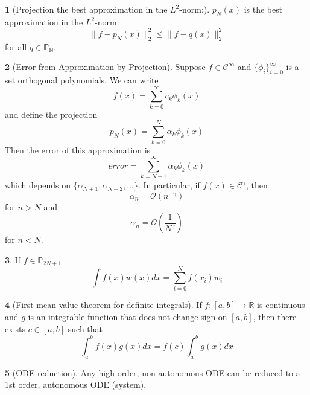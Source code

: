 \documentclass[12pt]{article}
\theoremstyle{definition}
\newtheorem{theorem}{\color{ForestGreen}{\textbf{Theorem}}}
\newcommand{\R}{\mathbb{R}}
\newcommand{\norm}[1]{\lVert#1\rVert}
\begin{document}
\begin{theorem}[Projection the best approximation in the $L^2$-norm:]
$p_N(x)$ is the best approximation in the $L^2$-norm:
\begin{equation}
\norm{f-p_N(x)}^2_2 \leq \norm{f-q(x)}^2_2
\end{equation}
for all $q \in \mathbb{P_N}$.
\end{theorem}

\begin{theorem}[Error from Approximation by Projection]
Suppose $f \in \mathcal{C}^\infty$ and $\{\phi_i\}_{i=0}^{\infty}$ is a set orthogonal polynomials. We can write
\begin{equation}
f(x) = \sum_{k=0}^\infty c_k \phi_k(x)
\end{equation}
and define the projection
\begin{equation}
p_N(x) = \sum_{k=0}^N \alpha_k \phi_k(x)
\end{equation}
Then the error of this approximation is
\begin{equation}
error = \sum_{k=N+1}^\infty \alpha_k \phi_k(x)
\end{equation}
which depends on $\{\alpha_{N+1}, \alpha_{N+2}, \ldots \}$. In particular, if $f(x) \in \mathcal{C}^\gamma$, then
\begin{equation}
\alpha_n = \mathcal{O}(n^{-\gamma})
\end{equation}
for $n > N$ and
\begin{equation}
\alpha_n = \mathcal{O}\left(\frac{1}{N^\gamma}\right)
\end{equation}
for $n < N$.
\end{theorem}

\begin{theorem}
If $f \in \mathbb{P}_{2N+1}$
\begin{equation}
\int f(x)w(x)dx = \sum_{i=0}^N f(x_i)w_i
\end{equation}
\end{theorem}

\begin{theorem}[First mean value theorem for definite integrals]
If $f:[a,b] \to \R$ is continuous and $g$ is an integrable function that does not change sign on $[a,b]$, then there exists $c \in [a,b]$ such that
\begin{equation}
\int_a^b f(x)g(x) dx = f(c)\int_a^b g(x)dx
\end{equation}
\end{theorem}

\begin{theorem}[ODE reduction]
Any high order, non-autonomous ODE can be reduced to a 1st order, autonomous ODE (system).
\end{theorem}
\end{document}
